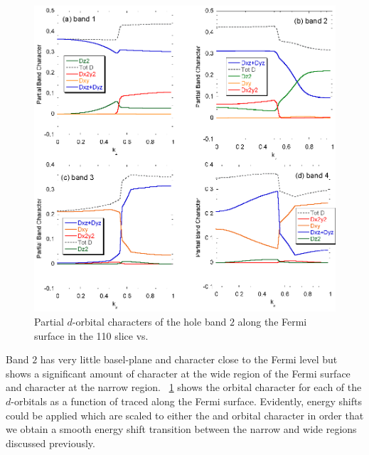 \begin{figure}[htbp]
    \begin{center}
        \includegraphics[scale=0.65]{Chapter3-dHvABaFe2P2/Figures/AngleDepMeasurements/BandCharacterVsKz/BandCharacterVsKz}
        \caption{Partial $d$-orbital characters of the hole band $2$ along the Fermi surface in the 110 slice vs. \kz}
        \label{Fig:3:Band2DCharacterVsKz}
    \end{center}
\end{figure}

Band $2$ has very little basel-plane \Dxy and \DxTwoyTwo character close to the Fermi level but shows a significant amount of \DzTwo character at the wide region of the Fermi surface and \DxzDyz character at the narrow region. \Fig~\ref{Fig:3:Band2DCharacterVsKz} shows the orbital character for each of the $d$-orbitals as a function of \kz traced along the Fermi surface. Evidently, energy shifts could be applied which are scaled to either the \DzTwo and \DxzDyz orbital character in order that we obtain a smooth energy shift transition between the narrow and wide regions discussed previously. 

